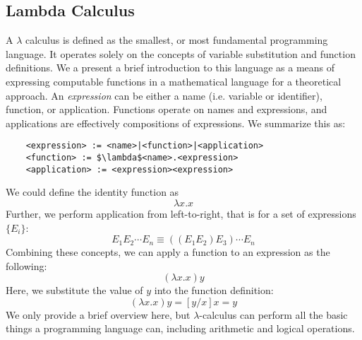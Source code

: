 \documentclass{article}
\begin{document}



\subsection{Lambda Calculus}

A $\lambda$ calculus is defined as the smallest, or most fundamental programming language. It operates solely on the concepts of variable substitution and function definitions. We a present a brief introduction to this language as a means of expressing computable functions in a mathematical language for a theoretical approach. An \textit{expression} can be either a name (i.e. variable or identifier), function, or application. Functions operate on names and expressions, and applications are effectively compositions of expressions. We summarize this as:

\begin{lstlisting}
    <expression> := <name>|<function>|<application>
    <function> := $\lambda$<name>.<expression>
    <application> := <expression><expression>
\end{lstlisting}

We could define the identity function as
\begin{equation*}
    \lambda x.x
\end{equation*}
Further, we perform application from left-to-right, that is for a set of expressions $\{E_i\}$:
\begin{equation*}
    E_1E_2\cdots E_n\equiv ((E_1E_2)E_3)\cdots E_n
\end{equation*}
Combining these concepts, we can apply a function to an expression as the following:
\begin{equation*}
    (\lambda x.x)y
\end{equation*}
Here, we substitute the value of $y$ into the function definition:
\begin{equation*}
    (\lambda x.x)y=[y/x]x=y
\end{equation*}
We only provide a brief overview here, but $\lambda$-calculus can perform all the basic things a programming language can, including arithmetic and logical operations.
\end{document}
